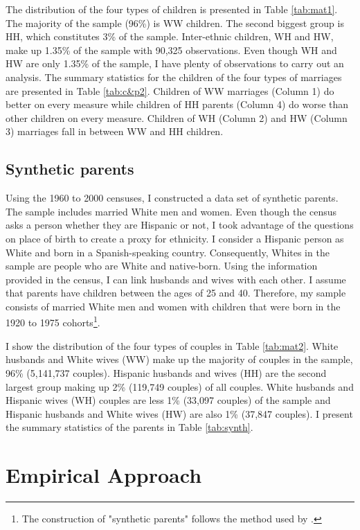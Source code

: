 The distribution of the four types of children is presented in Table \ref{tab:mat1}. The majority of the sample (96\%) is WW children. The second biggest group is HH, which constitutes 3\% of the sample. Inter-ethnic children, WH and HW, make up 1.35\% of the sample with 90,325 observations. Even though WH and HW are only 1.35\% of the sample, I have plenty of observations to carry out an analysis. The summary statistics for the children of the four types of marriages are presented in Table \ref{tab:c&p2}. Children of WW marriages (Column 1) do better on every measure while children of HH parents (Column 4) do worse than other children on every measure. Children of WH (Column 2) and HW (Column 3) marriages fall in between WW and HH children.

 
\subsection{Synthetic parents}

Using the 1960 to 2000 censuses, I constructed a data set of synthetic parents. The sample includes married White men and women. Even though the census asks a person whether they are Hispanic or not, I took advantage of the questions on place of birth to create a proxy for ethnicity. I consider a Hispanic person as White and born in a Spanish-speaking country. Consequently, Whites in the sample are people who are White and native-born. Using the information provided in the census, I can link husbands and wives with each other. I assume that parents have children between the ages of 25 and 40. Therefore, my sample consists of married White men and women with children that were born in the 1920 to 1975 cohorts\footnote{The construction of "synthetic parents" follows the method used by \textcite{rubinstein2014pride}.}.

I show the distribution of the four types of couples in Table \ref{tab:mat2}. White husbands and White wives (WW) make up the majority of couples in the sample, 96\% (5,141,737 couples). Hispanic husbands and wives (HH) are the second largest group making up 2\% (119,749 couples) of all couples. White husbands and Hispanic wives (WH) couples are less 1\% (33,097 couples) of the sample and Hispanic husbands and White wives (HW) are also 1\% (37,847 couples). I present the summary statistics of the parents in Table \ref{tab:synth}.

\section{Empirical Approach}\label{sec:emp_model}

